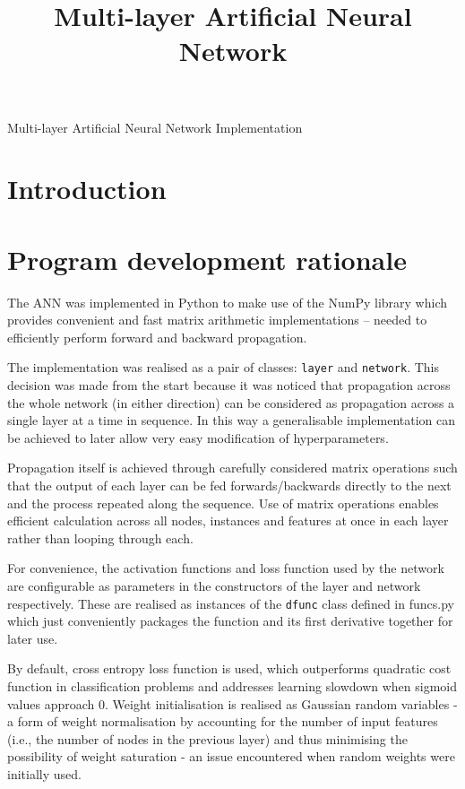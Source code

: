 \documentclass{article}
\begin{document}
\title{Multi-layer Artificial Neural Network}

\begin{center}
  \Large{Multi-layer Artificial Neural Network Implementation}
\end{center}

\section{Introduction}

\section{Program development rationale}

The ANN was implemented in Python to make use of the NumPy library which provides convenient and fast matrix arithmetic implementations --
needed to efficiently perform forward and backward propagation.

The implementation was realised as a pair of classes: \lstinline{layer} and \lstinline{network}. This decision was made from the start because
it was noticed that propagation across the whole network (in either
direction) can be considered as propagation across a single layer at a time in sequence. In this way a generalisable implementation can be achieved to later allow very easy modification of hyperparameters.

Propagation itself is achieved through carefully considered matrix
operations such that the output of each layer can be fed
forwards/backwards directly to the next and the process repeated along
the sequence. Use of matrix operations enables efficient calculation
across all nodes, instances and features at once in each layer rather
than looping through each.

For convenience, the activation functions and loss function used by the network are configurable as parameters in the constructors of the layer and network respectively. These are realised as instances of the \lstinline{dfunc} class defined in funcs.py which just conveniently packages the function and its first derivative together for later use.

By default, cross entropy loss function is used, which outperforms quadratic cost function in classification problems and addresses learning slowdown when sigmoid values approach 0.\cite{Nielsen} \cite{Xavier} Weight initialisation is realised as Gaussian random variables - a form of weight normalisation by accounting for the number of input features (i.e., the number of nodes in the previous layer) and thus minimising the possibility of weight saturation - an issue encountered when random weights were initially used.\cite{Nielsen}
\end{document}
